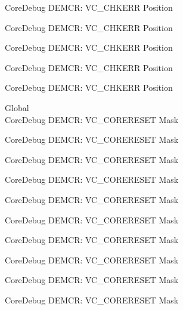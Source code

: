 \begin{DoxyRefList}
\label{deprecated__deprecated000885}%
%
Core\+Debug DEMCR\+: VC\+\_\+\+CHKERR Position 

\label{deprecated__deprecated001027}%
%
Core\+Debug DEMCR\+: VC\+\_\+\+CHKERR Position 

\label{deprecated__deprecated001103}%
%
Core\+Debug DEMCR\+: VC\+\_\+\+CHKERR Position 

\label{deprecated__deprecated001192}%
%
Core\+Debug DEMCR\+: VC\+\_\+\+CHKERR Position 

\label{deprecated__deprecated001294}%
%
Core\+Debug DEMCR\+: VC\+\_\+\+CHKERR Position  
\item[Global \doxylink{group___c_m_s_i_s___core_debug_ga906476e53c1e1487c30f3a1181df9e30}{Core\+Debug\+\_\+\+DEMCR\+\_\+\+VC\+\_\+\+CORERESET\+\_\+\+Msk} ]\hfill \\
\label{deprecated__deprecated000070}%
%
Core\+Debug DEMCR\+: VC\+\_\+\+CORERESET Mask 

\label{deprecated__deprecated000138}%
%
Core\+Debug DEMCR\+: VC\+\_\+\+CORERESET Mask 

\label{deprecated__deprecated000214}%
%
Core\+Debug DEMCR\+: VC\+\_\+\+CORERESET Mask 

\label{deprecated__deprecated000277}%
%
Core\+Debug DEMCR\+: VC\+\_\+\+CORERESET Mask 

\label{deprecated__deprecated000356}%
%
Core\+Debug DEMCR\+: VC\+\_\+\+CORERESET Mask 

\label{deprecated__deprecated000432}%
%
Core\+Debug DEMCR\+: VC\+\_\+\+CORERESET Mask 

\label{deprecated__deprecated000521}%
%
Core\+Debug DEMCR\+: VC\+\_\+\+CORERESET Mask 

\label{deprecated__deprecated000623}%
%
Core\+Debug DEMCR\+: VC\+\_\+\+CORERESET Mask 

\label{deprecated__deprecated000748}%
%
Core\+Debug DEMCR\+: VC\+\_\+\+CORERESET Mask 

\label{deprecated__deprecated000816}%
%
Core\+Debug DEMCR\+: VC\+\_\+\+CORERESET Mask 


\end{DoxyRefList}
